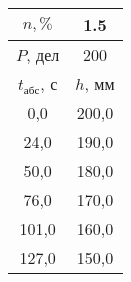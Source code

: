 \begin{tabular}[t]{|c|c|}
\hline
$n, \%$ & 1.5 \\
\hline
$P$, дел & 200 \\
\hline
$t_{абс}$, с & $h$, мм \\ 
\hline
0,0 & 200,0 \\ 
24,0 & 190,0 \\ 
50,0 & 180,0 \\ 
76,0 & 170,0 \\ 
101,0 & 160,0 \\ 
127,0 & 150,0 \\ 
\hline
\end{tabular}
